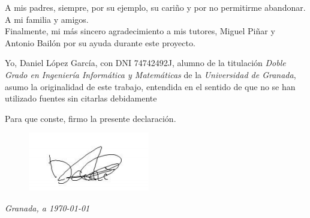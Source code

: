 \newpage


\thispagestyle{empty}

\quad

\newpage

\thispagestyle{empty}

\vspace*{2cm}

\begin{flushright}
\parbox{3.5in}
{\small
A mis padres, siempre, por su ejemplo, su cariño y por no permitirme abandonar. \\

A mi familia y amigos. \\

Finalmente, mi más sincero agradecimiento a mis tutores, Miguel Piñar y Antonio Bailón por su ayuda durante este proyecto.}

\end{flushright}

\newpage


Yo, Daniel López García, con DNI 74742492J, alumno de la titulación \emph{Doble Grado en Ingeniería Informática y Matemáticas} de la \emph{Universidad de Granada}, asumo la originalidad de este trabajo, entendida en el sentido de que no se han utilizado fuentes sin citarlas debidamente

\medskip 

Para que conste, firmo la presente declaración.

\bigskip
\begin{figure}[H]
	\includegraphics[scale=0.5]{img/firma.png}
\end{figure}

\noindent\textit{Granada, a \today} 

\smallskip

